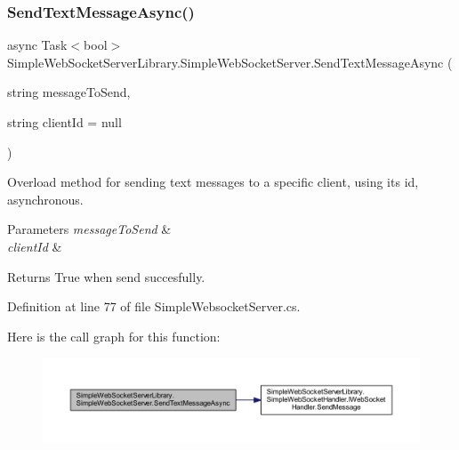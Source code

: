 \subsubsection{\texorpdfstring{Send\+Text\+Message\+Async()}{SendTextMessageAsync()}}
{\footnotesize\ttfamily async Task$<$bool$>$ Simple\+Web\+Socket\+Server\+Library.\+Simple\+Web\+Socket\+Server.\+Send\+Text\+Message\+Async (\begin{DoxyParamCaption}\item[{string}]{message\+To\+Send,  }\item[{string}]{client\+Id = {\ttfamily null} }\end{DoxyParamCaption})}



Overload method for sending text messages to a specific client, using it\textquotesingle{}s id, asynchronous. 


\begin{DoxyParams}{Parameters}
{\em message\+To\+Send} & \\
\hline
{\em client\+Id} & \\
\hline
\end{DoxyParams}
\begin{DoxyReturn}{Returns}
True when send succesfully.
\end{DoxyReturn}


Definition at line 77 of file Simple\+Websocket\+Server.\+cs.

Here is the call graph for this function\+:
\nopagebreak
\begin{figure}[H]
\begin{center}
\leavevmode
\includegraphics[width=350pt]{class_simple_web_socket_server_library_1_1_simple_web_socket_server_aefe75fd888dea52bd64108dd03abed61_cgraph}
\end{center}
\end{figure}
\mbox{\label{class_simple_web_socket_server_library_1_1_simple_web_socket_server_ad354c38a3f5583fe213ab913085c320a}} 
